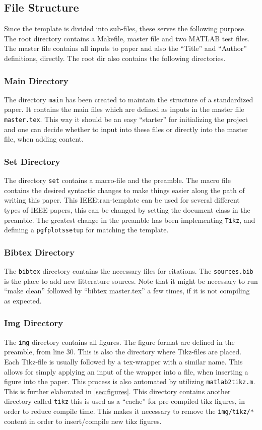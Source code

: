 \subsection{File Structure}
Since the template is divided into sub-files, these serves the following purpose. The root directory contains a Makefile, master file and two MATLAB test files. The master file contains all inputs to paper and also the ``Title'' and ``Author'' definitions, directly. The root dir also contains the following directories.
%

\subsubsection{Main Directory}
\label{sec:maindir}
The directory \texttt{main} has been created to maintain the structure of a standardized paper. It contains the main files which are defined as inputs in the master file \texttt{master.tex}. This way it should be an easy ``starter'' for initializing the project and one can decide whether to input into these files or directly into the master file, when adding content.
%
\subsubsection{Set Directory}
\label{sec:setdir}
The directory \texttt{set} contains a macro-file and the preamble. The macro file contains the desired syntactic changes to make things easier along the path of writing this paper. This IEEEtran-template\cite{IEEEhowto:IEEEtranpage} can be used for several different types of IEEE-papers, this can be changed by setting the document class in the preamble. The greatest change in the preamble has been implementing \texttt{Tikz}, and defining a \texttt{pgfplotssetup} for matching the template.
%
\subsubsection{Bibtex Directory}
\label{sec:bibtexdir}
The \texttt{bibtex} directory contains the necessary files for citations. The \texttt{sources.bib} is the place to add new litterature sources. Note that it might be necessary to run ``make clean'' followed by ``bibtex master.tex'' a few times, if it is not compiling as expected.
%
\subsubsection{Img Directory}
\label{sec:imgdir}
The \texttt{img} directory contains all figures. The figure format are defined in the preamble, from line 30. This is also the directory where Tikz-files are placed. Each Tikz-file is usually followed by a tex-wrapper with a similar name. This allows for simply applying an input of the wrapper into a file, when inserting a figure into the paper. This process is also automated by utilizing \texttt{matlab2tikz.m}. This is further elaborated in \cref{sec:figures}. This directory contains another directory called \texttt{tikz} this is used as a ``cache'' for pre-compiled tikz figures, in order to reduce compile time. This makes it necessary to remove the \texttt{img/tikz/*} content in order to insert/compile new tikz figures.
